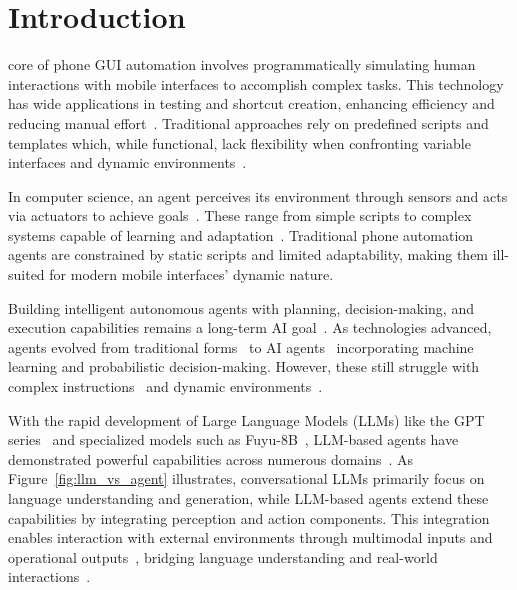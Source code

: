 \section{Introduction}
\label{sec:introduction}

 core of phone GUI automation involves programmatically simulating human interactions with mobile interfaces to accomplish complex tasks. This technology has wide applications in testing and shortcut creation, enhancing efficiency and reducing manual effort~\cite{azim2013targeted,pan2020reinforcement,koroglu2018qbe,li2019humanoid,degott2019learning}. Traditional approaches rely on predefined scripts and templates which, while functional, lack flexibility when confronting variable interfaces and dynamic environments~\cite{arnatovich2018systematic,deshmukh2023automated,nass2024overcoming,nass2021many,tramontana2019automated}.

In computer science, an agent perceives its environment through sensors and acts via actuators to achieve goals~\cite{li2024personal,guo2024large,wang2024survey,jin2024llms, bubeck2023sparks}. These range from simple scripts to complex systems capable of learning and adaptation~\cite{wang2024survey,jin2024llms,huang2024understanding}. Traditional phone automation agents are constrained by static scripts and limited adaptability, making them ill-suited for modern mobile interfaces' dynamic nature.

Building intelligent autonomous agents with planning, decision-making, and execution capabilities remains a long-term AI goal~\cite{albrecht2018autonomous}. As technologies advanced, agents evolved from traditional forms~\cite{anscombe2000intention,dennett1988precis,shoham1993agent} to AI agents~\cite{poole2010artificial,inkster2018empathy,gao2018neural} incorporating machine learning and probabilistic decision-making. However, these still struggle with complex instructions~\cite{luger2016like, amershi2014power} and dynamic environments~\cite{christiano2017deep, kohl2019mode}.

With the rapid development of Large Language Models (LLMs) like the GPT series~\cite{radford2018gpt1,radford2019gpt2,brown2020gpt3,achiam2023gpt} and specialized models such as Fuyu-8B~\cite{bavishi2023fuyu}, LLM-based agents have demonstrated powerful capabilities across numerous domains~\cite{wang2023voyager, hong2023metagpt, li2023camel, park2023generative, boiko2023emergent, qian2023communicative, xia2023towards, dasgupta2023collaborating, qian2024chatdev, dong2024self, goertzel2014artificial}. As Figure~\ref{fig:llm_vs_agent} illustrates, conversational LLMs primarily focus on language understanding and generation, while LLM-based agents extend these capabilities by integrating perception and action components. This integration enables interaction with external environments through multimodal inputs and operational outputs~\cite{wang2023voyager,hong2023metagpt,qian2024chatdev}, bridging language understanding and real-world interactions~\cite{xi2023rise,li2024personal,guo2024large,furuta2024exposing}.

